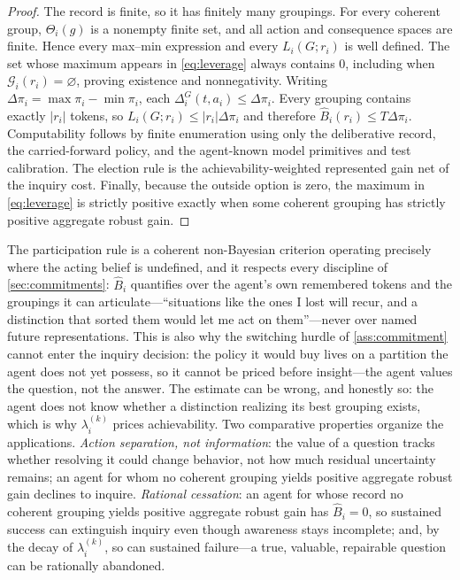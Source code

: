 \documentclass[11pt]{article}
\theoremstyle{definition}
\newcommand{\emptysetset}{\varnothing}
\begin{document}
\begin{proof}
The record is finite, so it has finitely many groupings.
For every coherent group, $\Theta_i(g)$ is a nonempty finite set, and all action and consequence spaces are finite.
Hence every max--min expression and every $L_i(G;r_i)$ is well defined.
The set whose maximum appears in \cref{eq:leverage} always contains $0$, including when $\mathcal G_i(r_i)=\emptysetset$, proving existence and nonnegativity.
Writing $\Delta \pi_i=\max \pi_i-\min \pi_i$, each $\Delta_i^G(t,a_i)\leq\Delta \pi_i$.
Every grouping contains exactly $\lvert r_i\rvert$ tokens, so $L_i(G;r_i)\leq\lvert r_i\rvert\Delta \pi_i$ and therefore $\widehat B_i(r_i)\leq T\Delta \pi_i$.
Computability follows by finite enumeration using only the deliberative record, the carried-forward policy, and the agent-known model primitives and test calibration.
The election rule is the achievability-weighted represented gain net of the inquiry cost.
Finally, because the outside option is zero, the maximum in \cref{eq:leverage} is strictly positive exactly when some coherent grouping has strictly positive aggregate robust gain.
\end{proof}

The participation rule is a coherent non-Bayesian criterion operating precisely where the acting belief is undefined, and it respects every discipline of \cref{sec:commitments}: $\widehat B_i$ quantifies over the agent's own remembered tokens and the groupings it can articulate---``situations like the ones I lost will recur, and a distinction that sorted them would let me act on them''---never over named future representations.
This is also why the switching hurdle of \cref{ass:commitment} cannot enter the inquiry decision: the policy it would buy lives on a partition the agent does not yet possess, so it cannot be priced before insight---the agent values the question, not the answer.
The estimate can be wrong, and honestly so: the agent does not know whether a distinction realizing its best grouping exists, which is why $\lambda_i^{(k)}$ prices achievability.
Two comparative properties organize the applications.
\emph{Action separation, not information}: the value of a question tracks whether resolving it could change behavior, not how much residual uncertainty remains; an agent for whom no coherent grouping yields positive aggregate robust gain declines to inquire.
\emph{Rational cessation}: an agent for whose record no coherent grouping yields positive aggregate robust gain has $\widehat B_i=0$, so sustained success can extinguish inquiry even though awareness stays incomplete; and, by the decay of $\lambda_i^{(k)}$, so can sustained failure---a true, valuable, repairable question can be rationally abandoned.
\end{document}
